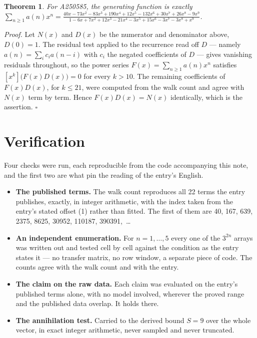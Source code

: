 \documentclass[11pt]{article}
\newtheorem{theorem}{Theorem}
\theoremstyle{definition}
\begin{document}
\begin{theorem} For A250585, the generating function is exactly $\sum_{n\ge 1} a(n)x^n = \frac{40x - 73x^{2} - 83x^{3} + 190x^{4} + 12x^{5} - 132x^{6} + 30x^{7} + 26x^{8} - 9x^{9}}{1 - 6x + 7x^{2} + 12x^{3} - 21x^{4} - 3x^{5} + 15x^{6} - 3x^{7} - 3x^{8} + x^{9}}$.\end{theorem}

{\itshape Proof.} Let $N(x)$ and $D(x)$ be the numerator and denominator above, $D(0)=1$. The residual test applied to the recurrence read off $D$ --- namely $a(n) = \sum_i c_i a(n-i)$ with $c_i$ the negated coefficients of $D$ --- gives vanishing residuals throughout, so the power series $F(x)=\sum_{n\ge 1}a(n)x^n$ satisfies $[x^k]\bigl(F(x)D(x)\bigr) = 0$ for every $k > 10$. The remaining coefficients of $F(x)D(x)$, for $k \le 21$, were computed from the walk count and agree with $N(x)$ term by term. Hence $F(x)D(x) = N(x)$ identically, which is the assertion. $\square$

\section{Verification}

Four checks were run, each reproducible from the code accompanying this note, and the first two are what pin the reading of the entry's English.

\begin{itemize}

\item {\bfseries The published terms.} The walk count reproduces all 22 terms the entry publishes, exactly, in integer arithmetic, with the index taken from the entry's stated offset (1) rather than fitted. The first of them are 40, 167, 639, 2375, 8625, 30952, 110187, 390391,~\dots

\item {\bfseries An independent enumeration.} For $n = 1,\dots,5$ every one of the $3^{2n}$ arrays was written out and tested cell by cell against the condition as the entry states it --- no transfer matrix, no row window, a separate piece of code. The counts agree with the walk count and with the entry.

\item {\bfseries The claim on the raw data.} Each claim was evaluated on the entry's published terms alone, with no model involved, wherever the proved range and the published data overlap. It holds there.

\item {\bfseries The annihilation test.} Carried to the derived bound $S = 9$ over the whole vector, in exact integer arithmetic, never sampled and never truncated.

\end{itemize}
\end{document}

